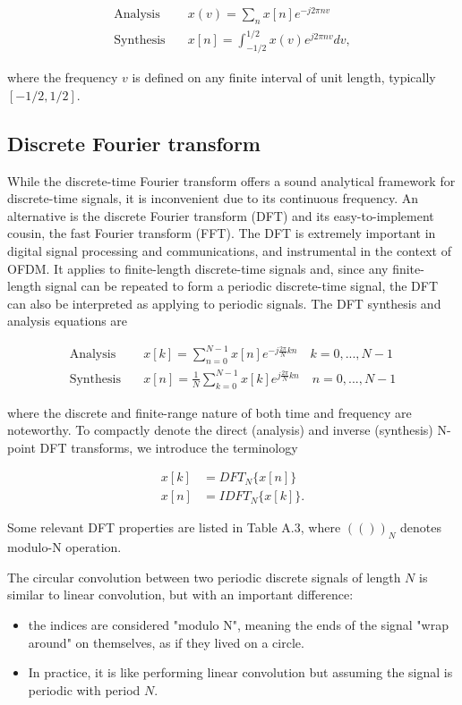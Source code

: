 \documentclass[a4paper, 12pt]{book}
\begin{document}
\begin{align}
    \text{Analysis} \quad & x(v)=\sum_{n}x[n]e^{-j2\pi nv} \tag{A.7} \\
    \text{Synthesis} \quad & x[n]=\int_{-1/2}^{1/2}x(v)e^{j2\pi nv}dv, \tag{A.8}
\end{align}

where the frequency $v$ is defined on any finite interval of unit length, typically $[-1/2, 1/2]$.

\subsection{Discrete Fourier transform}

While the discrete-time Fourier transform offers a sound analytical framework for discrete-time signals, it is inconvenient due to its continuous frequency. An alternative is the discrete Fourier transform (DFT) and its easy-to-implement cousin, the fast Fourier transform (FFT). The DFT is extremely important in digital signal processing and communications, and instrumental in the context of OFDM. It applies to finite-length discrete-time signals and, since any finite-length signal can be repeated to form a periodic discrete-time signal, the DFT can also be interpreted as applying to periodic signals. The DFT synthesis and analysis equations are

\begin{align}
    \text{Analysis} \quad & x[k]=\sum_{n=0}^{N-1}x[n]e^{-j\frac{2\pi}{N}kn} \quad k=0,...,N-1 \tag{A.9} \\
    \text{Synthesis} \quad & x[n]=\frac{1}{N}\sum_{k=0}^{N-1}x[k]e^{j\frac{2\pi}{N}kn} \quad n=0,...,N-1 \tag{A.10}
\end{align}

where the discrete and finite-range nature of both time and frequency are noteworthy. To compactly denote the direct (analysis) and inverse (synthesis) N-point DFT transforms, we introduce the terminology

\begin{align}
    x[k] &= DFT_{N}\{x[n]\} \tag{A.11} \\
    x[n] &= IDFT_{N}\{x[k]\}. \tag{A.12}
\end{align}

Some relevant DFT properties are listed in Table A.3, where $(())_N$ denotes modulo-N operation.

\begin{purplebox}
The circular convolution between two periodic discrete signals of length $N$ is similar to linear convolution, but with an important difference:
\begin{itemize}
    \item the indices are considered "modulo N", meaning the ends of the signal "wrap around" on themselves, as if they lived on a circle.
    \item In practice, it is like performing linear convolution but assuming the signal is periodic with period $N$.
\end{itemize}
\end{purplebox}
\end{document}
